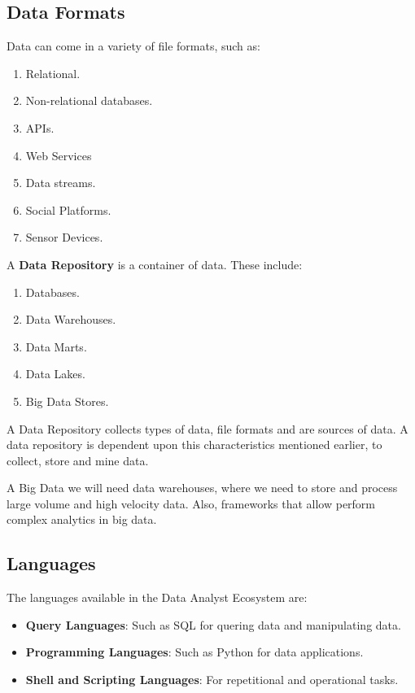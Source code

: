 \documentclass[../../ibm_data_analysis.tex]{subfiles}
\begin{document}
    \subsection{Data Formats}

    Data can come in a variety of file formats, such as:
    \begin{enumerate}
        \item Relational.
        \item Non-relational databases.
        \item APIs.
        \item Web Services
        \item Data streams.
        \item Social Platforms.
        \item Sensor Devices.
    \end{enumerate}

    \begin{mydef}
        A \textbf{Data Repository} is a container of data. These include:
        \begin{enumerate}
            \item Databases.
            \item Data Warehouses.
            \item Data Marts.
            \item Data Lakes.
            \item Big Data Stores.
        \end{enumerate}
    \end{mydef}

    A Data Repository collects types of data, file formats and are sources of data. A data repository is dependent upon this characteristics mentioned earlier, to collect, store and mine data.

    \begin{exa}
        A Big Data we will need data warehouses, where we need to store and process large volume and high velocity data. Also, frameworks that allow perform complex analytics in big data.
    \end{exa}

    \subsection{Languages}

    The languages available in the Data Analyst Ecosystem are:
    \begin{itemize}
        \item \textbf{Query Languages}: Such as SQL for quering data and manipulating data.
        \item \textbf{Programming Languages}: Such as Python for data applications.
        \item \textbf{Shell and Scripting Languages}: For repetitional and operational tasks.
    \end{itemize}
\end{document}
